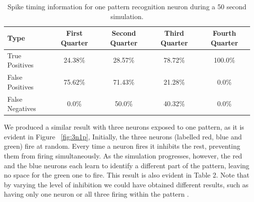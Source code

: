 \documentclass[a4paper,11pt]{article}
\begin{document}
\begin{table}[H]
\centering
\begin{tabular}{lllll}
\hline
\multicolumn{1}{l}{\textbf{Type}} & \multicolumn{1}{c}{\textbf{First Quarter}} & \multicolumn{1}{c}{\textbf{Second Quarter}} & \multicolumn{1}{c}{\textbf{Third Quarter}} & \multicolumn{1}{c}{\textbf{Fourth Quarter}} \\ \hline
\multicolumn{1}{l}{True Positives} & \multicolumn{1}{c}{24.38\%} & \multicolumn{1}{c}{28.57\%} & \multicolumn{1}{c}{78.72\%} & \multicolumn{1}{c}{100.0\%} \\ \hline
\multicolumn{1}{l}{False Positives} & \multicolumn{1}{c}{75.62\%} & \multicolumn{1}{c}{71.43\%} & \multicolumn{1}{c}{21.28\%} & \multicolumn{1}{c}{0.0\%} \\ \hline
\multicolumn{1}{l}{False Negatives} & \multicolumn{1}{c}{0.0\%} & \multicolumn{1}{c}{50.0\%} & \multicolumn{1}{c}{40.32\%} & \multicolumn{1}{c}{0.0\%} \\ \hline
\end{tabular}
\caption{Spike timing information for one pattern recognition neuron during a 50 second simulation.}
\end{table}


We produced a similar result with three neurons exposed to one pattern, as it is evident in Figure ~\ref{fig:3n1p}, Initially, the three neurons (labelled red, blue and green) fire at random. Every time a neuron fires it inhibits the rest, preventing them from firing simultaneously. As the simulation progresses, however, the red and the blue neurons each learn to identify a different part of the pattern, leaving no space for the green one to fire. This result is also evident in Table 2. Note that by varying the level of inhibition we could have obtained different results, such as having only one neuron or all three firing within the pattern \cite{stdp2}. 
\end{document}
